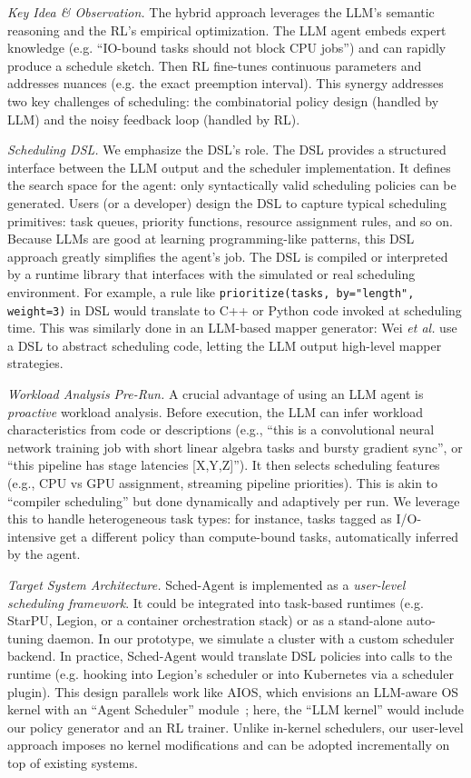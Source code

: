 \emph{Key Idea \& Observation.} The hybrid approach leverages the LLM's semantic reasoning and the RL's empirical optimization. The LLM agent embeds expert knowledge (e.g. ``IO-bound tasks should not block CPU jobs'') and can rapidly produce a schedule sketch. Then RL fine-tunes continuous parameters and addresses nuances (e.g. the exact preemption interval). This synergy addresses two key challenges of scheduling: the combinatorial policy design (handled by LLM) and the noisy feedback loop (handled by RL).

\emph{Scheduling DSL.} We emphasize the DSL's role. The DSL provides a structured interface between the LLM output and the scheduler implementation. It defines the search space for the agent: only syntactically valid scheduling policies can be generated. Users (or a developer) design the DSL to capture typical scheduling primitives: task queues, priority functions, resource assignment rules, and so on. Because LLMs are good at learning programming-like patterns, this DSL approach greatly simplifies the agent's job. The DSL is compiled or interpreted by a runtime library that interfaces with the simulated or real scheduling environment. For example, a rule like \texttt{prioritize(tasks, by="length", weight=3)} in DSL would translate to C++ or Python code invoked at scheduling time. This was similarly done in an LLM-based mapper generator: Wei \emph{et al.} use a DSL to abstract scheduling code, letting the LLM output high-level mapper strategies.

\emph{Workload Analysis Pre-Run.} A crucial advantage of using an LLM agent is \emph{proactive} workload analysis. Before execution, the LLM can infer workload characteristics from code or descriptions (e.g., ``this is a convolutional neural network training job with short linear algebra tasks and bursty gradient sync'', or ``this pipeline has stage latencies [X,Y,Z]''). It then selects scheduling features (e.g., CPU vs GPU assignment, streaming pipeline priorities). This is akin to ``compiler scheduling'' but done dynamically and adaptively per run. We leverage this to handle heterogeneous task types: for instance, tasks tagged as I/O-intensive get a different policy than compute-bound tasks, automatically inferred by the agent.

\emph{Target System Architecture.} Sched-Agent is implemented as a \emph{user-level scheduling framework}. It could be integrated into task-based runtimes (e.g. StarPU, Legion, or a container orchestration stack) or as a stand-alone auto-tuning daemon. In our prototype, we simulate a cluster with a custom scheduler backend. In practice, Sched-Agent would translate DSL policies into calls to the runtime (e.g. hooking into Legion's scheduler or into Kubernetes via a scheduler plugin). This design parallels work like AIOS, which envisions an LLM-aware OS kernel with an ``Agent Scheduler'' module~\cite{arxiv2403}; here, the ``LLM kernel'' would include our policy generator and an RL trainer. Unlike in-kernel schedulers, our user-level approach imposes no kernel modifications and can be adopted incrementally on top of existing systems.

